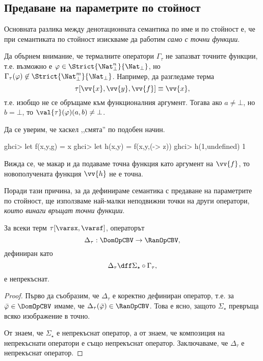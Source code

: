\subsection{Предаване на параметрите по стойност}

Основната разлика между денотационната семантика по име и по стойност е, че при семантиката по стойност
изискваме да работим {\em само с точни функции}.

\begin{remark}
  Да обърнем внимание, че термалните оператори $\Gamma_\tau$ не запазват точните функции, т.е.
  възможно е $\varphi \in \Strict{\Nat^n_\bot}{\Nat_\bot}$, но $\Gamma_\tau(\varphi) \not \in \Strict{\Nat^m_\bot}{\Nat_\bot}$.
  Например, да разгледаме терма
  \[\tau[\vv{x},\vv{y},\vv{f}] \equiv \vv{x},\]
  т.е. изобщо не се обръщаме към функционалния аргумент.
  Тогава ако $a \neq \bot$, но $b = \bot$, то $\val{\tau}(\varphi)(a,b) \neq \bot$.

  Да се уверим, че хаскел ,,смята'' по подобен начин.
  \begin{haskellcode}
ghci> let f(x,y,g) = x
ghci> let h(x,y) = f(x,y,(\z -> z))
ghci> h(1,undefined)
1
  \end{haskellcode}
  Вижда се, че макар и да подаваме точна функция като аргумент на $\vv{f}$, то новополучената функция $\vv{h}$ не е точна.
\end{remark}

Поради тази причина, за да дефинираме семантика с предаване на параметрите по стойност, ще използваме най-малки неподвижни точки
на други оператори, {\em които винаги връщат точни функции}.

\begin{framed}
  \begin{theorem}
    За всеки терм $\tau[\varsx,\varsf]$, операторът 
    \[\Delta_\tau:\DomOpCBV\to \RanOpCBV,\]
    дефиниран като
    \[\Delta_\tau \dff \Sigma_\star \circ \Gamma_\tau,\]
    е непрекъснат.
  \end{theorem}
\end{framed}
\begin{proof}
  Първо да съобразим, че $\Delta_\tau$ е коректно дефиниран оператор, т.е. 
  за $\bar{\varphi} \in \DomOpCBV$ имаме, че $\Delta_\tau(\bar{\varphi}) \in \RanOpCBV$.
  Това е ясно, защото $\Sigma_\star$ превръща всяко изображение в точно.
  
  От  знаем, че $\Sigma_\star$ е непрекъснат оператор, а от 
  знаем, че композиция на непрекъснати оператори е също непрекъснат оператор.
  Заключаваме, че $\Delta_\tau$ е непрекъснат оператор.    
\end{proof}

